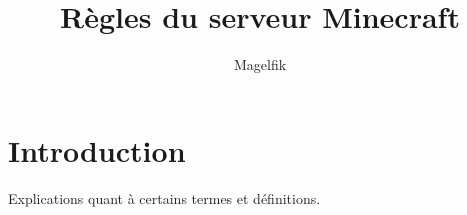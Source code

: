 \documentclass[a4paper,11pt]{article}
\author{Magelfik}
\title{R\`egles du serveur Minecraft}
\begin{document}
\maketitle


\clearpage
\tableofcontents
\clearpage

\section{Introduction}
Explications quant \`a certains termes et d\'efinitions.
\section{}

\clearpage
\end{document}
